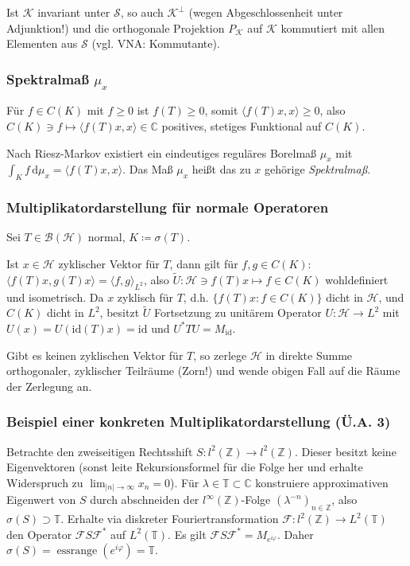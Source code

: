\documentclass[11pt,a4paper]{scrartcl}
\newcommand{\Z}{\mathbb{Z}} %
\newcommand{\C}{\mathbb{C}} %
\newcommand{\Hc}{\mathcal{H}}
\newcommand{\Sc}{\mathcal{S}}
\newcommand{\Kc}{\mathcal{K}}
\newcommand{\B}{\mathcal{B}}
\newcommand{\F}{\mathcal{F}}
\theoremstyle{plain}
\theoremstyle{definition}
\theoremstyle{remark}
\DeclareMathOperator{\essrange}{ess range}
\begin{document}
Ist $\Kc$ invariant unter $\Sc$, so auch $\Kc^\bot$ (wegen Abgeschlossenheit unter Adjunktion!) und die orthogonale Projektion $P_\Kc$ auf $\Kc$ kommutiert mit allen Elementen aus $\Sc$ (vgl. VNA: Kommutante).

\subsubsection{Spektralmaß $\mu_x$}

Für $f\in C(K)$ mit $f \geq 0$ ist $f(T) \geq 0$, somit $\langle f(T)x, x \rangle \geq 0$, also $C(K)\ni f \mapsto \langle f(T)x,x \rangle \in \C$ positives, stetiges Funktional auf $C(K)$.

Nach Riesz-Markov existiert ein eindeutiges reguläres Borelmaß $\mu_x$ mit $\int_K f \,\mathrm{d}\mu_x = \langle f(T)x, x \rangle$. Das Maß $\mu_x$ heißt das zu $x$ gehörige \emph{Spektralmaß}.


\subsubsection{Multiplikatordarstellung für normale Operatoren}

Sei $T\in \B(\Hc)$ normal, $K\coloneqq \sigma(T)$. 

Ist $x\in \Hc$ zyklischer Vektor für $T$, dann gilt für $f,g\in C(K)$: $\langle f(T)x, g(T)x \rangle = \langle f,g\rangle_{L^2}$, also $\tilde U: \Hc\ni f(T)x \mapsto f \in C(K)$ wohldefiniert und isometrisch. Da $x$ zyklisch für $T$, d.h. $\{ f(T)x: f\in C(K) \}$ dicht in $\Hc$, und $C(K)$ dicht in $L^2$, besitzt $\tilde U$ Fortsetzung zu unitärem Operator $U: \Hc \to L^2$ mit $U(x)=U(\mathrm{id}(T)x)=\mathrm{id}$ und $U^*TU=M_\mathrm{id}$.

Gibt es keinen zyklischen Vektor für $T$, so zerlege $\Hc$ in direkte Summe orthogonaler, zyklischer Teilräume (Zorn!) und wende obigen Fall auf die Räume der Zerlegung an.

\subsubsection{Beispiel einer konkreten Multiplikatordarstellung (Ü.A. 3)}

Betrachte den zweiseitigen Rechtsshift $S: l^2(\Z) \to l^2(\Z)$. Dieser besitzt keine Eigenvektoren (sonst leite Rekursionsformel für die Folge her und erhalte Widerspruch zu $\lim_{|n|\to \infty} x_n = 0$). Für $\lambda \in \mathbb{T} \subset \C$ konstruiere approximativen Eigenwert von $S$ durch abschneiden der $l^\infty(\Z)$-Folge $(\lambda^{-n})_{n\in \Z}$, also $\sigma(S) \supset \mathbb{T}$. Erhalte via diskreter Fouriertransformation $\F: l^2(\Z) \to L^2(\mathbb T)$ den Operator $\F S\F^*$ auf $L^2(\mathbb T)$. Es gilt $\F S\F^*=M_{e^{i\varphi}}$. Daher $\sigma(S)=\essrange(e^{i\varphi})=\mathbb{T}$.
\end{document}
